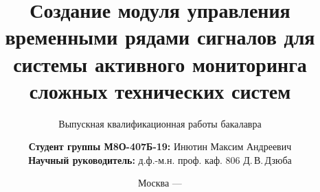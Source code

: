 \title{Создание модуля управления временными рядами сигналов для системы активного мониторинга сложных технических систем}
\subtitle{Выпускная квалификационная работы бакалавра}


\author[Инютин Максим Андреевич]
{
	\textbf{Студент группы М8О-407Б-19:} Инютин Максим Андреевич\\
	\textbf{Научный руководитель:} д.ф.-м.н. проф. каф. 806 Д.\,В.\,Дзюба
}


\date{Москва --- \the\year}

